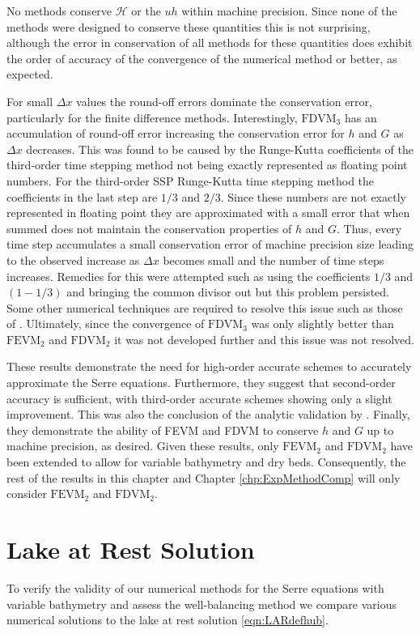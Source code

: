 No methods conserve $\mathcal{H}$ or the $uh$ within machine precision. Since none of the methods were designed to conserve these quantities this is not surprising, although the error in conservation of all methods for these quantities does exhibit the order of accuracy of the convergence of the numerical method or better, as expected. 

For small $\Delta x$ values the round-off errors dominate the conservation error, particularly for the finite difference methods. Interestingly, $\text{FDVM}_3$ has an accumulation of round-off error increasing the conservation error for $h$ and $G$ as $\Delta x$ decreases. This was found to be caused by the Runge-Kutta coefficients of the third-order time stepping method \cite{Zoppou-etal-2017} not being exactly represented as floating point numbers. For the third-order SSP Runge-Kutta time stepping method the coefficients in the last step are $1/3$ and $2/3$. Since these numbers are not exactly represented in floating point they are approximated with a small error that when summed does not maintain the conservation properties of $h$ and $G$. Thus, every time step accumulates a small conservation error of machine precision size leading to the observed increase as $\Delta x$ becomes small and the number of time steps increases. Remedies for this were attempted such as using the coefficients $1/3$ and $(1- 1/3)$ and bringing the common divisor out but this problem persisted. Some other numerical techniques are required to resolve this issue such as those of \citet{higham2002}. Ultimately, since the convergence of $\text{FDVM}_3$ was only slightly better than $\text{FEVM}_2$ and $\text{FDVM}_2$ \cite{Zoppou-etal-2017} it was not developed further and this issue was not resolved.

These results demonstrate the need for high-order accurate schemes to accurately approximate the Serre equations. Furthermore, they suggest that second-order accuracy is sufficient, with third-order accurate schemes showing only a slight improvement. This was also the conclusion of the analytic validation by \citet{Zoppou-etal-2017}. Finally, they demonstrate the ability of FEVM and FDVM to conserve $h$ and $G$ up to machine precision, as desired. Given these results, only $\text{FEVM}_2$ and $\text{FDVM}_2$ have been extended to allow for variable bathymetry and dry beds. Consequently, the rest of the results in this chapter and Chapter \ref{chp:ExpMethodComp} will only consider $\text{FEVM}_2$ and $\text{FDVM}_2$. 

\section{Lake at Rest Solution}
To verify the validity of our numerical methods for the Serre equations with variable bathymetry and assess the well-balancing method we compare various numerical solutions to the lake at rest solution \eqref{eqn:LARdefhub}.

